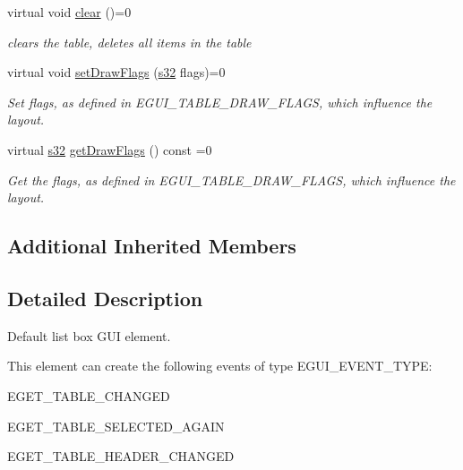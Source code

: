 \begin{DoxyCompactItemize}
\mbox{\label{classirr_1_1gui_1_1IGUITable_ad0b1f8cefa1cbdcede986b16abc868c0}} 
virtual void \hyperlink{classirr_1_1gui_1_1IGUITable_ad0b1f8cefa1cbdcede986b16abc868c0}{clear} ()=0
\begin{DoxyCompactList}\small\item\em clears the table, deletes all items in the table \end{DoxyCompactList}\item 
\mbox{\label{classirr_1_1gui_1_1IGUITable_ae777eb5b146642659801d1af32b9c978}} 
virtual void \hyperlink{classirr_1_1gui_1_1IGUITable_ae777eb5b146642659801d1af32b9c978}{set\+Draw\+Flags} (\hyperlink{namespaceirr_ac66849b7a6ed16e30ebede579f9b47c6}{s32} flags)=0
\begin{DoxyCompactList}\small\item\em Set flags, as defined in E\+G\+U\+I\+\_\+\+T\+A\+B\+L\+E\+\_\+\+D\+R\+A\+W\+\_\+\+F\+L\+A\+GS, which influence the layout. \end{DoxyCompactList}\item 
\mbox{\label{classirr_1_1gui_1_1IGUITable_aeb6fc401f70a8aa21225663ec9195ee1}} 
virtual \hyperlink{namespaceirr_ac66849b7a6ed16e30ebede579f9b47c6}{s32} \hyperlink{classirr_1_1gui_1_1IGUITable_aeb6fc401f70a8aa21225663ec9195ee1}{get\+Draw\+Flags} () const =0
\begin{DoxyCompactList}\small\item\em Get the flags, as defined in E\+G\+U\+I\+\_\+\+T\+A\+B\+L\+E\+\_\+\+D\+R\+A\+W\+\_\+\+F\+L\+A\+GS, which influence the layout. \end{DoxyCompactList}\end{DoxyCompactItemize}
\subsection*{Additional Inherited Members}


\subsection{Detailed Description}
Default list box G\+UI element. 

\begin{DoxyParagraph}{This element can create the following events of type E\+G\+U\+I\+\_\+\+E\+V\+E\+N\+T\+\_\+\+T\+Y\+PE\+:}
\begin{DoxyItemize}
\item E\+G\+E\+T\+\_\+\+T\+A\+B\+L\+E\+\_\+\+C\+H\+A\+N\+G\+ED \item E\+G\+E\+T\+\_\+\+T\+A\+B\+L\+E\+\_\+\+S\+E\+L\+E\+C\+T\+E\+D\+\_\+\+A\+G\+A\+IN \item E\+G\+E\+T\+\_\+\+T\+A\+B\+L\+E\+\_\+\+H\+E\+A\+D\+E\+R\+\_\+\+C\+H\+A\+N\+G\+ED \end{DoxyItemize}

\end{DoxyParagraph}


